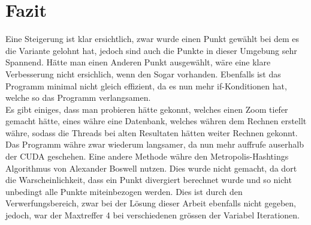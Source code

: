 \section{Fazit}
Eine Steigerung ist klar ersichtlich, zwar wurde einen Punkt gewählt bei dem es die Variante gelohnt hat, jedoch sind auch die Punkte in dieser Umgebung sehr Spannend. Hätte man einen Anderen Punkt ausgewählt, wäre eine klare Verbesserung nicht ersichlich, wenn den Sogar vorhanden. Ebenfalls ist das Programm minimal nicht gleich effizient, da es nun mehr if-Konditionen hat, welche so das Programm verlangsamen.\\
Es gibt einiges, dass man probieren hätte gekonnt, welches einen Zoom tiefer gemacht hätte, eines währe eine Datenbank, welches währen dem Rechnen erstellt währe, sodass die Threads bei alten Resultaten hätten weiter Rechnen gekonnt. Das Programm währe zwar wiederum langsamer, da nun mehr auffrufe auserhalb der CUDA geschehen. Eine andere Methode währe den Metropolis-Hashtings Algorithmus von Alexander Boswell nutzen. Dies wurde nicht gemacht, da dort die Warscheinlichkeit, dass ein Punkt divergiert berechnet wurde und so nicht unbedingt alle Punkte miteinbezogen werden. Dies ist durch den Verwerfungsbereich, zwar bei der Lösung dieser Arbeit ebenfalls nicht gegeben, jedoch, war der Maxtreffer 4 bei verschiedenen grössen der Variabel Iterationen.